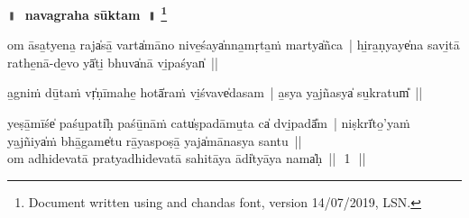 \documentclass[parskip, DIV=14]{scrartcl}
\renewcommand{\thefootnote}{\fnsymbol{footnote}} %
\begin{document}

\vspace{-1.5cm}

\begin{center}
\textbf{{\Huge॥\,~navagraha sūktam~॥  \LARGE\let\thefootnote\relax\footnote{\color{lightgray} Document written using \XeLaTeX{} and chandas font,  version 14/07/2019, LSN.}}}
\end{center}
\Large

{%

\vspace{0.5cm}



\Large
\vspace{1.5cm}


om āsa̱tyena̱ raja̍sā̱ varta̍māno nive̱śaya̍nna̱mṛta̱ṁ martya̍ñca~| 
hi̱ra̱ṇyaye̍na savi̱tā rathe̱nā-de̱vo yā̍ti̱ bhuva̍nā vi̱paśyan̍~||


a̱gniṁ dū̱taṁ vṛ̍ṇīmahe̱ hotā̍raṁ vi̱śvave̍dasam~| 
a̱sya ya̱jñasya̍ su̱kratum̎~||


yeṣā̱mīśe̍ paśu̱pati̍ḥ paśū̱nāṁ catu̍ṣpadāmu̱ta ca̍ dvi̱padā̎m~| 
niṣkrī̍to̱’yaṁ ya̱jñiya̍ṁ bhā̱game̍tu rā̱yaspoṣā̱ yaja̍mānasya santu~||\\


om adhidevatā pratyadhidevatā sahitāya ādi̍tyāya॒ nama̍ḥ~||~\,1\,~||

}
\end{document}
